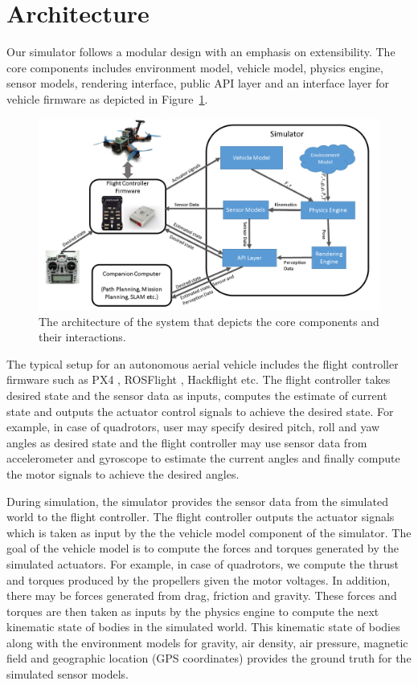 \documentclass[graybox]{svmult}
\begin{document}
	\section{Architecture}
	Our simulator follows a modular design with an emphasis on extensibility. The core components includes environment model, vehicle model, physics engine, sensor models, rendering interface, public API layer and an interface layer for vehicle firmware as depicted in Figure~\ref{fig:arch}.
	
	\begin{figure}[ttbp]
		\includegraphics[width=\textwidth]{overview.png}
		\caption{The architecture of the system that depicts the core components and their interactions.}
		\label{fig:arch}
	\end{figure}
	
	The typical setup for an autonomous aerial vehicle includes the flight controller firmware such as PX4 \cite{meier2011pixhawk}, ROSFlight \cite{jackson2016rosflight}, Hackflight\cite{levyHackflight} etc. The flight controller takes desired state and the sensor data as inputs, computes the estimate of current state and outputs the actuator control signals to achieve the desired state. For example, in case of quadrotors, user may specify desired pitch, roll and yaw angles as desired state and the flight controller may use sensor data from accelerometer and gyroscope to estimate the current angles and finally compute the motor signals to achieve the desired angles.
	
	During simulation, the simulator provides the sensor data from the simulated world to the flight controller. The flight controller outputs the actuator signals which is taken as input by the the vehicle model component of the simulator. The goal of the vehicle model is to compute the forces and torques generated by the simulated actuators. For example, in case of quadrotors, we compute the thrust and torques produced by the propellers given the motor voltages. In addition, there may be forces generated from drag, friction and gravity. These forces and torques are then taken as inputs by the physics engine to compute the next kinematic state of bodies in the simulated world. This kinematic state of bodies along with the environment models for gravity, air density, air pressure, magnetic field and geographic location (GPS coordinates) provides the ground truth for the simulated sensor models.
	
\end{document}
